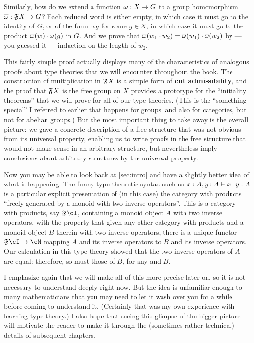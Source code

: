 Similarly, how do we extend a function $\omega:X\to G$ to a group homomorphism $\overline{\omega}:\mathfrak{F}_{}X\to G$?
Each reduced word is either empty, in which case it must go to the identity of $G$, or of the form $wg$ for some $g\in X$, in which case it must go to the product $\overline{\omega}(w)\cdot \omega(g)$ in $G$.
And we prove that $\overline{\omega}(w_1\cdot w_2) = \overline{\omega}(w_1)\cdot \overline{\omega}(w_2)$ by --- you guessed it --- induction on the length of $w_2$.

This fairly simple proof actually displays many of the characteristics of analogous proofs about type theories that we will encounter throughout the book.
The construction of multiplication in $\mathfrak{F}_{}X$ is a simple form of \textbf{cut admissibility}, and the proof that $\mathfrak{F}_{}X$ is the free group on $X$ provides a prototype for the ``initiality theorems'' that we will prove for all of our type theories.
(This is the ``something special'' I referred to earlier that happens for groups, and also for categories, but not for abelian groups.)
But the most important thing to take away is the overall picture: we gave a concrete description of a free structure that was not obvious from its universal property, enabling us to write proofs in the free structure that would not make sense in an arbitrary structure, but nevertheless imply conclusions about arbitrary structures by the universal property.

Now you may be able to look back at \cref{sec:intro} and have a slightly better idea of what is happening.
The funny type-theoretic syntax such as $x:A,y:A \vdash x\cdot y :A$ is a particular explicit presentation of (in this case) the category with products ``freely generated by a monoid with two inverse operators''.
This is a category with products, say $\F{}\cI$, containing a monoid object $A$ with two inverse operators, with the property that given any other category with products \cM and a monoid object $B$ therein with two inverse operators, there is a unique functor $\F{}\cI \to \cM$ mapping $A$ and its inverse operators to $B$ and its inverse operators.
Our calculation in this type theory showed that the two inverse operators of $A$ are equal; therefore, so must those of $B$, for any \cM and $B$.

I emphasize again that we will make all of this more precise later on, so it is not necessary to understand deeply right now.
But the idea is unfamiliar enough to many mathematicians that you may need to let it wash over you for a while before coming to understand it.
(Certainly that was my own experience with learning type theory.)
I also hope that seeing this glimpse of the bigger picture will motivate the reader to make it through the (sometimes rather technical) details of subsequent chapters.

